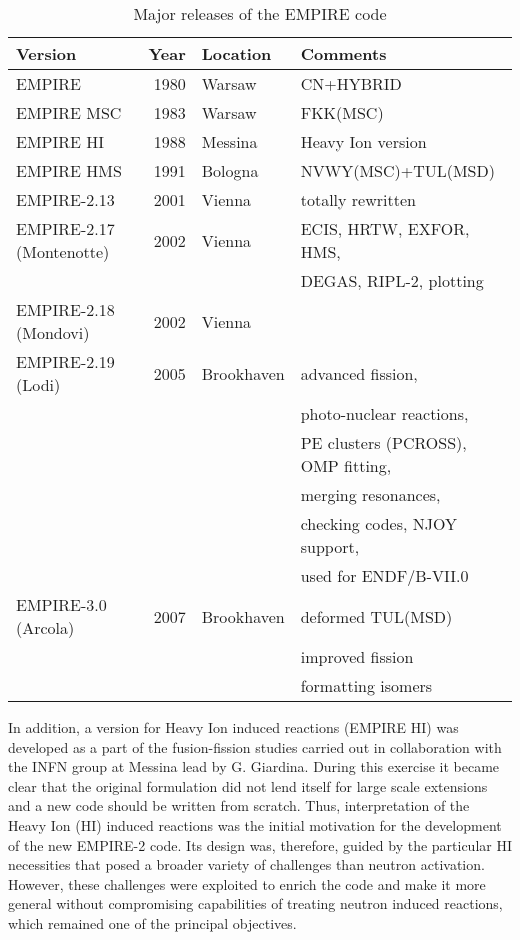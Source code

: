 \begin{table*}[tbp]
\caption{Major releases of the EMPIRE code}
\label{tab:emp-history}%
\begin{tabular}{lrll}
\hline
\textbf{Version} & \textbf{\ Year } & \textbf{Location} & \textbf{Comments}
\\ \hline
EMPIRE & 1980 & Warsaw & CN+HYBRID \\
EMPIRE MSC & 1983 & Warsaw & FKK(MSC) \\
EMPIRE HI & 1988 & Messina & Heavy Ion version \\
EMPIRE HMS & 1991 & Bologna & NVWY(MSC)+TUL(MSD) \\
EMPIRE-2.13 & 2001 & Vienna & totally rewritten \\
EMPIRE-2.17 (Montenotte) & 2002 & Vienna & ECIS, HRTW, EXFOR, HMS, \\
&  &  & DEGAS, RIPL-2, plotting \\
EMPIRE-2.18 (Mondovi) & 2002 & Vienna &  \\
EMPIRE-2.19 (Lodi) & 2005 & Brookhaven & advanced fission, \\
&  &  & photo-nuclear reactions, \\
&  &  & PE clusters (PCROSS), OMP fitting, \\
&  &  & merging resonances, \\
&  &  & checking codes, NJOY support, \\
&  &  & used for ENDF/B-VII.0 \\
EMPIRE-3.0 (Arcola) & 2007 & Brookhaven & deformed TUL(MSD) \\
&  &  & improved fission \\
&  &  & formatting isomers \\ \hline
\end{tabular}%
\end{table*}

In addition, a version for Heavy Ion induced reactions (EMPIRE HI) was
developed as a part of the fusion-fission studies carried out in
collaboration with the INFN group at Messina lead by G. Giardina. During
this exercise it became clear that the original formulation did not lend
itself for large scale extensions and a new code should be written from
scratch. Thus, interpretation of the Heavy Ion (HI) induced reactions was
the initial motivation for the development of the new EMPIRE-2 code. Its
design was, therefore, guided by the particular HI necessities that posed a
broader variety of challenges than neutron activation. However, these
challenges were exploited to enrich the code and make it more general
without compromising capabilities of treating neutron induced reactions,
which remained one of the principal objectives.

